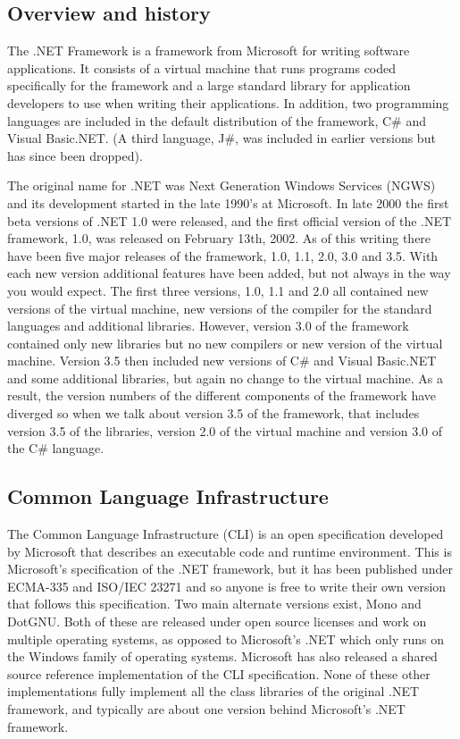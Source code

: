 \subsection{Overview and history}
	The .NET Framework is a framework from Microsoft for writing software 
	applications. It consists of a virtual machine that runs programs coded 
	specifically for the framework and a large standard library for application 
	developers to use when writing their applications. In addition, two 
	programming languages are included in the default distribution of the 
	framework, C\# and Visual Basic.NET. (A third language, J\#, was included in
	earlier versions but has since been dropped).

	The original name for .NET was Next Generation Windows Services (NGWS) and 
	its development started in the late 1990's at Microsoft. In late 2000 the 
	first beta versions of .NET 1.0 were released, and the first official 
	version of the .NET framework, 1.0, was released on February 13th, 2002. As 
	of this writing there have been five major releases of the framework, 1.0, 
	1.1, 2.0, 3.0 and 3.5. With each new version additional features have been 
	added, but not always in the way you would expect. The first three versions, 
	1.0, 1.1 and 2.0 all contained new versions of the virtual machine, new 
	versions of the compiler for the standard languages and additional 
	libraries. However, version 3.0 of the framework contained only new 
	libraries but no new compilers or new version of the virtual machine. 
	Version 3.5 then included new versions of C\# and Visual Basic.NET and some 
	additional libraries, but again no change to the virtual machine. As a 
	result, the version numbers of the different components of the framework 
	have diverged so when we talk about version 3.5 of the framework, that 
	includes version 3.5 of the libraries, version 2.0 of the virtual machine 
	and version 3.0 of the C\# language. 

\subsection{Common Language Infrastructure}

	The Common Language Infrastructure (CLI) is an open specification developed 
	by Microsoft that describes an executable code and runtime environment. This 
	is Microsoft's specification of the .NET framework, but it has been 
	published under ECMA-335 and ISO/IEC 23271 and so anyone is free to write 
	their own version that follows this specification. Two main alternate 
	versions exist, Mono and DotGNU. Both of these are released under open 
	source licenses and work on multiple operating systems, as opposed to 
	Microsoft's .NET which only runs on the Windows family of operating systems. 
	Microsoft has also released a shared source reference implementation of the 
	CLI specification. None of these other implementations fully implement all 
	the class libraries of the original .NET framework, and typically are about 
	one version behind Microsoft's .NET framework.

